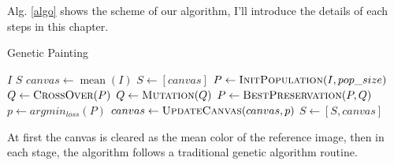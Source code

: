 \documentclass[a4paper,conference]{IEEEtran}
\begin{document}
Alg. \ref{algo} shows the scheme of our algorithm, I'll introduce the details of each steps in this chapter.

\begin{algorithm}
    \caption{Genetic Painting}
    \begin{algorithmic}[1]
        \Require $I$ 
        \Ensure $S$ 
        \State $canvas \gets \mathop{\mathrm{mean}}(I)$
        \State $S \gets [canvas]$
            \State {}
            \State {}
            \State $P \gets \Call{InitPopulation}{I, pop\_size}$
            \State {}
                \State $Q \gets \Call{CrossOver}{P}$
                \State $Q \gets \Call{Mutation}{Q}$
                \State {}
                \State $P \gets \Call{BestPreservation}{P, Q}$
            \EndFor
            \State $p \gets argmin_{loss}(P)$
            \State $canvas \gets \Call{UpdateCanvas}{canvas, p}$
            \State $S \gets [S, canvas]$
        \EndFor
    \end{algorithmic}
    \label{algo}
\end{algorithm}

At first the canvas is cleared as the mean color of the reference image, then in each stage, the algorithm follows a traditional genetic algorithm routine. 
\end{document}
